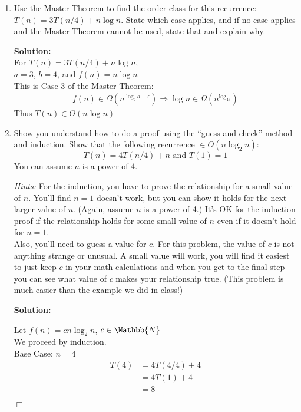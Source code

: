 \documentclass[10pt]{article}
\newenvironment{proof}{\par\noindent{\it Proof.}\hspace*{1em}}{$\Box$\bigskip}
\begin{document}
\begin{enumerate}
    	\item Use the Master Theorem to find the order-class for this recurrence: $T(n) = 3 T (n/4) + n \log n$.  State which case applies, and if no case applies and the Master Theorem cannot be used, state that and explain why.
    	
    	\textbf{Solution:} \\
    	For $T(n) = 3T(n/4) + n \log n$, \\
        $a = 3$, $b = 4$, and $f(n) = n \log n$ \\
        This is Case 3 of the Master Theorem:
        \begin{align*}
            f(n) \in \Omega(n^{\log_ba + \epsilon}) \Longrightarrow \log n \in \Omega(n^{\log_43})
        \end{align*}
        Thus $T(n) \in \Theta(n \log n)$
    	
    	\item Show you understand how to do a proof using the ``guess and check'' method and induction.   Show that the following recurrence $\in O(n \log_2 n)$:
    	$$T(n) = 4 T(n/4) + n \textrm{ and } T(1) = 1$$ 
    	You can assume $n$ is a power of 4.
    	
    	\emph{Hints:} For the induction, you have to prove the relationship for a small value of $n$.  You'll find $n=1$ doesn't work, but you can show it holds for the
    	next larger value of $n$.  (Again, assume $n$ is a power of 4.) It's OK for the induction proof if the relationship holds for some small value of $n$ even
    	if it doesn't hold for $n=1$.\\
    	Also, you'll need to guess a value for $c$. For this problem, the value of $c$ is not anything strange or unusual.  A small value will work, you will find it easiest to just keep $c$ in your math calculations and when you get to the final step you can see what value of $c$ makes your relationship true. 
    	(This problem is much easier than the example we did in class!) 
    	
    	\textbf{Solution:}  
    	\begin{proof}
    	Let $f(n) = cn\log_2n$, $c \in \Mathbb{N}$  \\
    	We proceed by induction.    \\
    	Base Case: $n = 4$
    	\begin{align*}
    	T(4) &= 4T(4/4) + 4   \\
    	&= 4T(1) + 4  \\
    	&= 8
    	\end{align*}
    	

\end{proof}
\end{enumerate}
\end{document}
